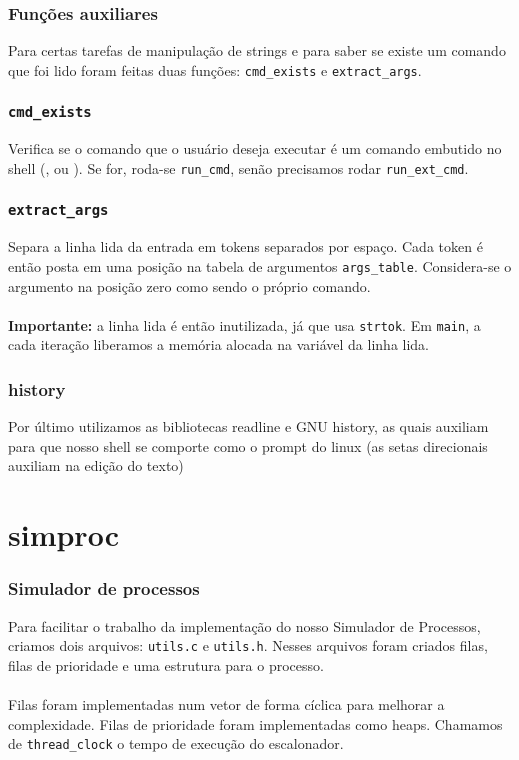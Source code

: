 \documentclass{beamer}
\begin{document}
\begin{frame}
  \frametitle{Funções auxiliares}
  Para certas tarefas de manipulação de strings e para saber se existe um comando que foi lido foram feitas duas funções: \texttt{cmd\_exists} e \texttt{extract\_args}. 
\end{frame}


\begin{frame}
  \frametitle{\texttt{cmd\_exists}}
  Verifica se o comando que o usuário deseja executar é um comando embutido no shell (,  ou ). Se for, roda-se \texttt{run\_cmd}, senão precisamos rodar \texttt{run\_ext\_cmd}.
\end{frame}


\begin{frame}
  \frametitle{\texttt{extract\_args}}
  Separa a linha lida da entrada em tokens separados por espaço. Cada token é então posta em uma posição na tabela de argumentos \texttt{args\_table}. Considera-se o argumento na posição zero como sendo o próprio comando. \\~\\
  
  \textbf{Importante:} a linha lida é então inutilizada, já que usa \texttt{strtok}. Em \texttt{main}, a cada iteração liberamos a memória alocada na variável da linha lida.
\end{frame}

\begin{frame}
    \frametitle{history}
    Por último utilizamos as bibliotecas readline e GNU history, as quais auxiliam para que nosso shell se comporte como o prompt do linux (as setas direcionais auxiliam na edição do texto)

\end{frame}

\section{simproc}

\begin{frame}
  \frametitle{Simulador de processos}
  Para facilitar o trabalho da implementação do nosso Simulador de Processos, criamos dois arquivos: \texttt{utils.c} e \texttt{utils.h}. Nesses arquivos foram criados filas, filas de prioridade e uma estrutura para o processo. \\~\\

  Filas foram implementadas num vetor de forma cíclica para melhorar a complexidade. Filas de prioridade foram implementadas como heaps. Chamamos de \texttt{thread\_clock} o tempo de execução do escalonador.
\end{frame}
\end{document}

